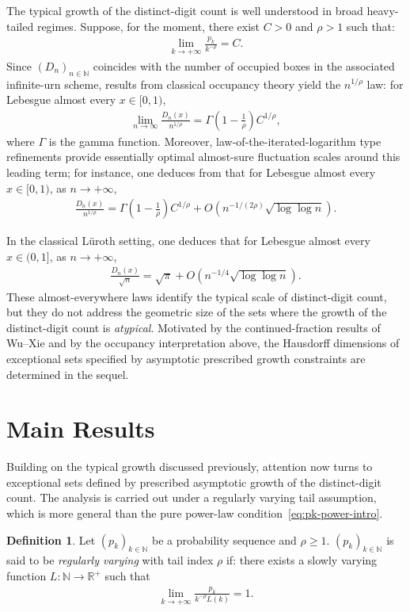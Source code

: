 \documentclass[12pt,reqno]{amsart}
\theoremstyle{definition}
\newtheorem*{defi}{Definition}
\theoremstyle{plain}
\begin{document}
The typical growth of the distinct-digit count is well understood in broad heavy-tailed regimes. Suppose, for the moment, there exist $C>0$ and $\rho>1$ such that:
\begin{align}\label{eq:pk-power-intro}
    \lim_{k\to+\infty}\frac{p_k}{k^{-\rho}}=C.
\end{align}
Since $(D_n)_{n\in\mathbb{N}}$ coincides with the number of occupied boxes in the associated infinite-urn scheme, results from classical occupancy theory \cite{GnedinHansenPitman2007Occupancy,Karlin1967InfiniteUrnCLT} yield the $n^{1/\rho}$ law: for Lebesgue almost every $x\in[0,1)$,
\begin{align*}
    \lim_{n\to\infty}\frac{D_n(x)}{n^{1/\rho}}
    =\Gamma\!\left(1-\frac{1}{\rho}\right) C^{1/\rho},
\end{align*}
where $\Gamma$ is the gamma function. Moreover, law-of-the-iterated-logarithm type refinements provide essentially optimal almost-sure fluctuation scales around this leading term; for instance, one deduces from \cite{BuraczewskiIksanovKotelnikova2025LIL} that for Lebesgue almost every $x\in[0,1)$, as $n\to+\infty$,
\begin{align*}
    \frac{D_n(x)}{n^{1/\rho}}
    =\Gamma\!\left(1-\frac{1}{\rho}\right) C^{1/\rho}
    +O\!\left(n^{-1/(2\rho)}\sqrt{\log\log n}\right).
\end{align*}

In the classical L\"uroth setting, one deduces that for Lebesgue almost every $x\in(0,1]$, as $n\to+\infty$,
\begin{align*}
    \frac{D_n(x)}{\sqrt{n}}=\sqrt{\pi}+O\!\left(n^{-1/4}\sqrt{\log\log n}\right).
\end{align*}
These almost-everywhere laws identify the typical scale of distinct-digit count, but they do not address the geometric size of the sets where the growth of the distinct-digit count is \emph{atypical}. Motivated by the continued-fraction results of Wu--Xie \cite{WuXie2017RangeRenewalCF} and by the occupancy interpretation above, the Hausdorff dimensions of exceptional sets specified by asymptotic prescribed growth constraints are determined in the sequel.

\section{Main Results} 

Building on the typical growth discussed previously, attention now turns to exceptional sets defined by prescribed asymptotic growth of the distinct-digit count. The analysis is carried out under a regularly varying tail assumption, which is more general than the pure power-law condition~\eqref{eq:pk-power-intro}.
\begin{defi}\label{def:RV}
Let $(p_k)_{k\in\mathbb{N}}$ be a probability sequence and $\rho\geq 1$. $(p_k)_{k\in\mathbb{N}}$ is said to be \emph{regularly varying} with tail index $\rho$ if: there exists a slowly varying function $L:\mathbb{N}\to\mathbb{R}^+$ such that
\begin{align}\label{eq:rv}
    \lim_{k\to+\infty}\frac{p_k}{k^{-\rho}L(k)}=1.
\end{align}
\end{defi}
\end{document}
